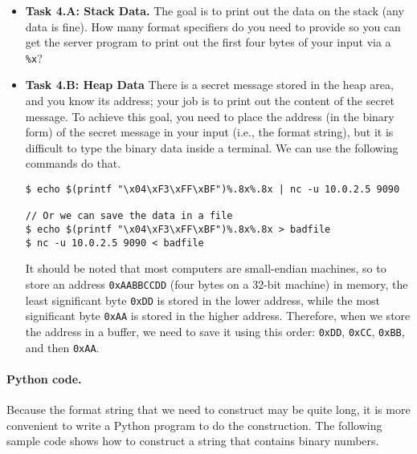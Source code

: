 \begin{itemize} 
\item \textbf{Task 4.A: Stack Data.}
The goal is to print out the data on the stack (any data is fine). 
How many format specifiers do you need to provide so you can get 
the server program to print out the first four bytes of your 
input via a \texttt{\%x}? 


\item \textbf{Task 4.B: Heap Data} 
There is a secret message stored in the heap area, and you know 
its address; your job is to print out the content of the secret message. 
To achieve this goal, you need to place the address (in the binary form) 
of the secret message in your input (i.e., the format string), but
it is difficult to type the binary data inside a terminal. We can use the following commands 
do that. 

\begin{lstlisting}
$ echo $(printf "\x04\xF3\xFF\xBF")%.8x%.8x | nc -u 10.0.2.5 9090

// Or we can save the data in a file
$ echo $(printf "\x04\xF3\xFF\xBF")%.8x%.8x > badfile
$ nc -u 10.0.2.5 9090 < badfile
\end{lstlisting}

It should be noted that most computers are small-endian machines, so to store
an address \texttt{0xAABBCCDD} (four bytes on a 32-bit machine) in memory, 
the least significant byte \texttt{0xDD} is stored in the lower address,
while the most significant byte \texttt{0xAA} is stored in the higher 
address. Therefore, when we store the address in a buffer, we need to 
save it using this order: \texttt{0xDD}, \texttt{0xCC}, \texttt{0xBB}, and 
then \texttt{0xAA}. 
\end{itemize} 


\paragraph{Python code.} Because the format string that 
we need to construct may be quite long, it is more convenient 
to write a Python program to do the construction. The 
following sample code shows how to construct 
a string that contains binary numbers. 


